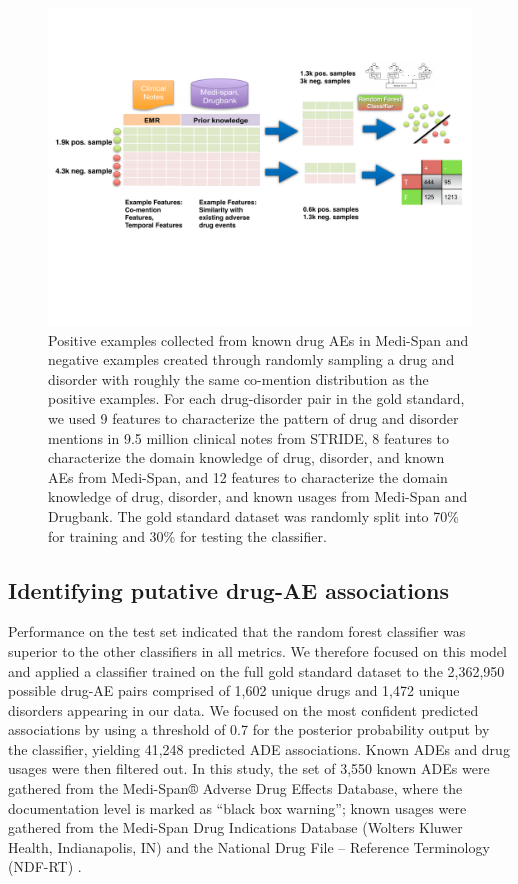 \begin{figure}
  \begin{center}
    \includegraphics[width=0.9\linewidth]{ch3-figures/Figure3.pdf}
  \end{center}
  \caption[Training a classifier to recognize ADEs]{Positive examples
    collected from known drug AEs in Medi-Span and negative examples
    created through randomly sampling a drug and disorder with roughly
    the same co-mention distribution as the positive examples. For
    each drug-disorder pair in the gold standard, we used 9 features
    to characterize the pattern of drug and disorder mentions in 9.5
    million clinical notes from STRIDE, 8 features to characterize the
    domain knowledge of drug, disorder, and known AEs from Medi-Span,
    and 12 features to characterize the domain knowledge of drug,
    disorder, and known usages from Medi-Span and Drugbank. The gold
    standard dataset was randomly split into 70\% for training and
    30\% for testing the classifier.}
  \label{fig:short}
\end{figure}


\subsection{Identifying putative drug-AE associations}
Performance on the test set indicated that the random forest
classifier was superior to the other classifiers in all metrics. We
therefore focused on this model and applied a classifier trained on
the full gold standard dataset to the 2,362,950 possible drug-AE pairs
comprised of 1,602 unique drugs and 1,472 unique disorders appearing
in our data. We focused on the most confident predicted associations
by using a threshold of 0.7 for the posterior probability output by
the classifier, yielding 41,248 predicted ADE associations.  Known
ADEs and drug usages were then filtered out.  In this study, the set
of 3,550 known ADEs were gathered from the Medi-Span® Adverse Drug
Effects Database, where the documentation level is marked as “black
box warning”; known usages were gathered from the Medi-Span Drug
Indications Database (Wolters Kluwer Health, Indianapolis, IN) and the
National Drug File – Reference Terminology (NDF-RT) \cite{Brown2004}.


